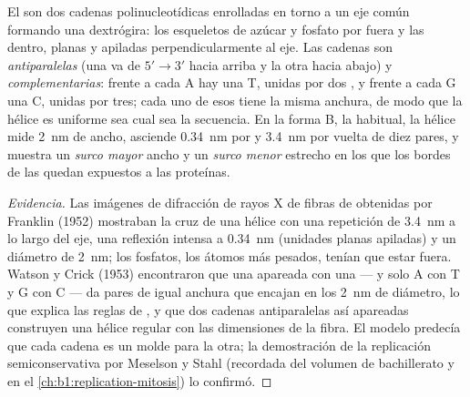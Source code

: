 \begin{theorem}\label{thm:b1:nucleic-acids:helix}
El  son dos cadenas polinucleotídicas enrolladas en torno a un eje común
formando una \emph{} dextrógira: los esqueletos de azúcar y
fosfato por fuera y las  dentro, planas y apiladas perpendicularmente
al eje. Las cadenas son \emph{antiparalelas} (una va de $5' \to 3'$ hacia
arriba y la otra hacia abajo) y \emph{complementarias}: frente a cada A hay
una T, unidas por dos , y frente a cada G una C, unidas
por tres; cada uno de esos \emph{} tiene la misma anchura, de
modo que la hélice es uniforme sea cual sea la secuencia. En la forma B, la
habitual, la hélice mide \qty{2}{nm} de ancho, asciende \qty{0.34}{nm} por
 y \qty{3.4}{nm} por vuelta de diez pares, y muestra un
\emph{surco mayor} ancho y un \emph{surco menor} estrecho en los que los
bordes de las  quedan expuestos a las proteínas.
\end{theorem}
\begin{proof}[Evidencia]
Las imágenes de difracción de rayos X de fibras de  obtenidas por
Franklin (1952) mostraban la cruz de una hélice con una repetición de
\qty{3.4}{nm} a lo largo del eje, una reflexión intensa a \qty{0.34}{nm}
(unidades planas apiladas) y un diámetro de \qty{2}{nm}; los fosfatos, los
átomos más pesados, tenían que estar fuera. Watson y Crick (1953)
encontraron que una  apareada con una  --- y solo A con T y
G con C --- da pares de igual anchura que encajan en los \qty{2}{nm} de
diámetro, lo que explica las reglas de , y que dos cadenas
antiparalelas así apareadas construyen una hélice regular con las
dimensiones de la fibra. El modelo predecía que cada cadena es un molde para
la otra; la demostración de la replicación semiconservativa por Meselson y
Stahl (recordada del volumen de bachillerato y en el
\cref{ch:b1:replication-mitosis}) lo confirmó.
\end{proof}

